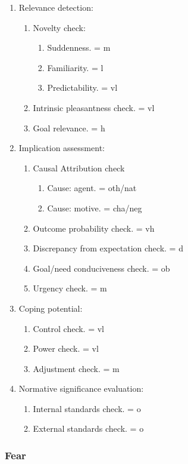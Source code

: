 \begin{enumerate}
\item  Relevance detection:
\begin{enumerate}
\item  Novelty check:
\begin{enumerate}
\item  Suddenness. = m
\item  Familiarity. = l
\item  Predictability. = vl
\end{enumerate}
\item  Intrinsic pleasantness check. = vl
\item  Goal relevance. = h
\end{enumerate}
\item  Implication assessment:
\begin{enumerate}
\item  Causal Attribution check
\begin{enumerate}
\item  Cause: agent. = oth/nat
\item  Cause: motive. = cha/neg
\end{enumerate}
\item  Outcome probability check. = vh
\item  Discrepancy from expectation check. = d
\item  Goal/need conduciveness check. = ob
\item  Urgency check. = m
\end{enumerate}
\item  Coping potential:
\begin{enumerate}
\item  Control check. = vl
\item  Power check. = vl
\item  Adjustment check. = m
\end{enumerate}
\item  Normative significance evaluation:
\begin{enumerate}
\item  Internal standards check. = o
\item  External standards check. = o
\end{enumerate}
\end{enumerate}

\subsubsection{Fear}

